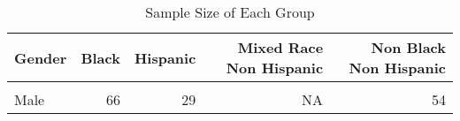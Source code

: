 \begin{table}[H]

\caption{\label{tab:summarystats_n}Sample Size of Each Group}
\centering
\begin{tabular}[t]{lrrrr}
\toprule
Gender & Black & Hispanic & Mixed Race Non Hispanic & Non Black Non Hispanic\\
\midrule
\cellcolor{gray!6}{Female} & \cellcolor{gray!6}{9} & \cellcolor{gray!6}{6} & \cellcolor{gray!6}{1} & \cellcolor{gray!6}{13}\\
Male & 66 & 29 & NA & 54\\
\bottomrule
\end{tabular}
\end{table}
